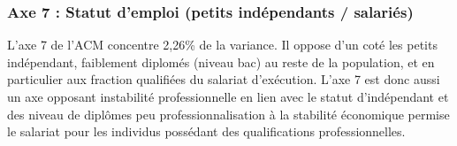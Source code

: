 \documentclass[
  12pt,
]{book}
\begin{document}
\subsubsection{Axe 7 : Statut d'emploi (petits indépendants /
salariés)}\label{axe-7-statut-demploi-petits-induxe9pendants-salariuxe9s}

L'axe 7 de l'ACM concentre 2,26\% de la variance. Il oppose d'un coté
les petits indépendant, faiblement diplomés (niveau bac) au reste de la
population, et en particulier aux fraction qualifiées du salariat
d'exécution. L'axe 7 est donc aussi un axe opposant instabilité
professionnelle en lien avec le statut d'indépendant et des niveau de
diplômes peu professionnalisation à la stabilité économique permise le
salariat pour les individus possédant des qualifications
professionnelles.

\begingroup\fontsize{7}{9}\selectfont
\end{document}
